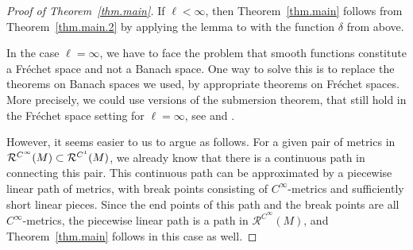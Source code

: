\documentclass[11pt]{article}
\numberwithin{equation}{section}
\newcommand\ceq{\coloneqq}
\newcommand\<{\langle}
\renewcommand\>{\rangle}
\newcommand{\maM}{\mathcal M}
\newcommand{\maR}{\mathcal R}
\theoremstyle{definition}
\newcommand\={\,=\,}
\numberwithin{equation}{section}
\begin{document}
\begin{proof}[Proof of Theorem~\ref{thm.main}]
If $\ell < \infty$, then Theorem~\ref{thm.main} follows from Theorem~\ref{thm.main.2} by applying the lemma to \smash{$\maM\ceq \maR^{C^\ell}(M)$} with the function $\delta$ from above.

In the case $\ell = \infty$, we have to face the problem that smooth functions constitute a Fr\'echet space and not a Banach space. One way to solve this is to replace the theorems on Banach spaces we used, by appropriate theorems on Fr\'echet spaces. More precisely, we could use versions of the submersion theorem, that still hold in the Fr\'echet space setting for $\ell=\infty$, see \cite[Proposition~III.11]{neeb.wagemann} and \cite[around Theorem~D]{gloeckner}.

However, it seems easier to us to argue as follows.
For a given pair of metrics in $\smash{\maR^{C^\infty}(M)}\subset\smash{\maR^{C^1}(M)}$, we already know
that there is a continuous path in \smash{$\maR^{C^1}(M)$} connecting this pair.
This continuous path can be approximated by a piecewise linear path of metrics, with break points consisting of $C^\infty$-metrics and sufficiently short linear pieces. Since the end points of this path and the break points are all $C^\infty$-metrics, the piecewise linear path is a path in $\maR^{C^\infty}(M)$, and Theorem~\ref{thm.main} follows in this case as well.
\end{proof}
\end{document}
